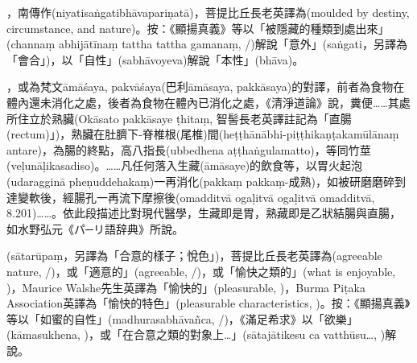 \startitemgroup[noteitems]
\item{}，南傳作(niyatisaṅgatibhāvapariṇatā)，菩提比丘長老英譯為(moulded by destiny, circumstance, and nature)。按：《顯揚真義》等以「被隱藏的種類到處出來」(channaṃ abhijātīnaṃ tattha tattha gamanaṃ, /)解說「意外」(saṅgati，另譯為「會合」)，以「自性」(sabhāvoyeva)解說「本性」(bhāva)。
\stopitemgroup

\startitemgroup[noteitems]
\item{}，或為梵文āmāśaya, pakvāśaya(巴利āmāsaya, pakkāsaya)的對譯，前者為食物在體內還未消化之處，後者為食物在體內已消化之處，《清淨道論》說，糞便……其處所住立於熟臟(Okāsato pakkāsaye ṭhitaṃ, 智髻長老英譯註記為「直腸(rectum)」)，熟臟在肚臍下-脊椎根(尾椎)間(heṭṭhānābhi-piṭṭhikaṇṭakamūlānaṃ antare)，為腸的終點，高八指長(ubbedhena aṭṭhaṅgulamatto)，等同竹莖(veḷunāḷikasadiso)。……凡任何落入生藏(āmāsaye)的飲食等，以胃火起泡(udaragginā pheṇuddehakaṃ)一再消化(pakkaṃ pakkaṃ-成熟)，如被研磨磨碎到達變軟後，經腸孔一再流下摩擦後(omadditvā ogaḷitvā ogaḷitvā omadditvā, 8.201)……。依此段描述比對現代醫學，生藏即是胃，熟藏即是乙狀結腸與直腸，如水野弘元《パ─リ語辞典》所說。
\stopitemgroup

\startitemgroup[noteitems]
\item{}(sātarūpaṃ，另譯為「合意的樣子；悅色」)，菩提比丘長老英譯為(agreeable nature, /)，或「適意的」(agreeable, /)，或「愉快之類的」(what is enjoyable, )，Maurice Walshe先生英譯為「愉快的」(pleasurable, )，Burma Piṭaka Association英譯為「愉快的特色」(pleasurable characteristics, )。按：《顯揚真義》等以「如蜜的自性」(madhurasabhāvañca, /)，《滿足希求》以「欲樂」(kāmasukhena, )，或「在合意之類的對象上…」(sātajātikesu ca vatthūsu…, )解說。
\stopitemgroup

